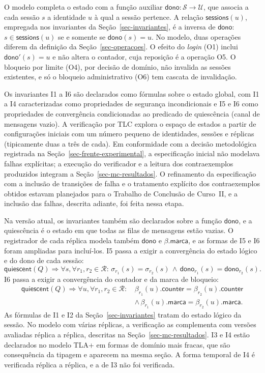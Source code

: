O modelo completa o estado com a função auxiliar $\textsf{dono} : \mathcal{S} \to \mathcal{U}$, que associa a cada sessão $s$ a identidade $u$ à qual a sessão pertence. A relação $\textsf{sessions}(u)$, empregada nos invariantes da Seção~\ref{sec-invariantes}, é a inversa de $\textsf{dono}$: $s \in \textsf{sessions}(u)$ se e somente se $\textsf{dono}(s) = u$. No modelo, duas operações diferem da definição da Seção~\ref{sec-operacoes}. O efeito do \emph{login} (O1) inclui $\textsf{dono}'(s) = u$ e não altera o contador, cuja reposição é a operação O5. O bloqueio por limite (O4), por decisão de domínio, não invalida as sessões existentes, e só o bloqueio administrativo (O6) tem cascata de invalidação.

Os invariantes I1 a I6 são declarados como fórmulas sobre o estado global, com I1 a I4 caracterizadas como propriedades de segurança incondicionais e I5 e I6 como propriedades de convergência condicionadas ao predicado de quiescência (canal de mensagens vazio). A verificação por TLC explora o espaço de estados a partir de configurações iniciais com um número pequeno de identidades, sessões e réplicas (tipicamente duas a três de cada). Em conformidade com a decisão metodológica registrada na Seção~\ref{sec-frente-experimental}, a especificação inicial não modelava falhas explícitas; a execução do verificador e a leitura dos contraexemplos produzidos integram a Seção~\ref{sec-mc-resultados}. O refinamento da especificação com a inclusão de transições de falha e o tratamento explícito dos contraexemplos obtidos estavam planejados para o Trabalho de Conclusão de Curso~II, e a inclusão das falhas, descrita adiante, foi feita nessa etapa.

Na versão atual, os invariantes também são declarados sobre a função $\textsf{dono}$, e a quiescência é o estado em que todas as filas de mensagens estão vazias. O registrador de cada réplica modela também $\textsf{dono}$ e $\beta.\textsf{marca}$, e as formas de I5 e I6 foram ampliadas para incluí-los. I5 passa a exigir a convergência do estado lógico e do dono de cada sessão:
\[
\textsf{quiescent}(Q) \Rightarrow \forall s, \forall r_1, r_2 \in \mathcal{R}: \, \sigma_{r_1}(s) = \sigma_{r_2}(s) \, \land \, \textsf{dono}_{r_1}(s) = \textsf{dono}_{r_2}(s).
\]
I6 passa a exigir a convergência do contador e da marca de bloqueio:
\[
\begin{aligned}
\textsf{quiescent}(Q) \Rightarrow \forall u, \forall r_1, r_2 \in \mathcal{R}: \, & \beta_{r_1}(u).\textsf{counter} = \beta_{r_2}(u).\textsf{counter} \\
& \land \, \beta_{r_1}(u).\textsf{marca} = \beta_{r_2}(u).\textsf{marca}.
\end{aligned}
\]
As fórmulas de I1 e I2 da Seção~\ref{sec-invariantes} tratam do estado lógico da sessão. No modelo com várias réplicas, a verificação as complementa com versões avaliadas réplica a réplica, descritas na Seção~\ref{sec-mc-resultados}. I3 e I4 estão declarados no modelo TLA+ em formas de domínio mais fracas, que são consequência da tipagem e aparecem na mesma seção. A forma temporal de I4 é verificada réplica a réplica, e a de I3 não foi verificada.

